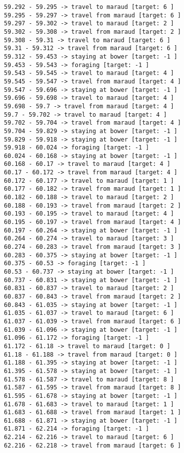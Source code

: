\documentclass[11pt]{article}
\begin{document}
\begin{Verbatim}[commandchars=\\\{\}]
59.292 - 59.295 -> travel to maraud [target: 6 ]
59.295 - 59.297 -> travel from maraud [target: 6 ]
59.297 - 59.302 -> travel to maraud [target: 2 ]
59.302 - 59.308 -> travel from maraud [target: 2 ]
59.308 - 59.31 -> travel to maraud [target: 6 ]
59.31 - 59.312 -> travel from maraud [target: 6 ]
59.312 - 59.453 -> staying at bower [target: -1 ]
59.453 - 59.543 -> foraging [target: -1 ]
59.543 - 59.545 -> travel to maraud [target: 4 ]
59.545 - 59.547 -> travel from maraud [target: 4 ]
59.547 - 59.696 -> staying at bower [target: -1 ]
59.696 - 59.698 -> travel to maraud [target: 4 ]
59.698 - 59.7 -> travel from maraud [target: 4 ]
59.7 - 59.702 -> travel to maraud [target: 4 ]
59.702 - 59.704 -> travel from maraud [target: 4 ]
59.704 - 59.829 -> staying at bower [target: -1 ]
59.829 - 59.918 -> staying at bower [target: -1 ]
59.918 - 60.024 -> foraging [target: -1 ]
60.024 - 60.168 -> staying at bower [target: -1 ]
60.168 - 60.17 -> travel to maraud [target: 4 ]
60.17 - 60.172 -> travel from maraud [target: 4 ]
60.172 - 60.177 -> travel to maraud [target: 1 ]
60.177 - 60.182 -> travel from maraud [target: 1 ]
60.182 - 60.188 -> travel to maraud [target: 2 ]
60.188 - 60.193 -> travel from maraud [target: 2 ]
60.193 - 60.195 -> travel to maraud [target: 4 ]
60.195 - 60.197 -> travel from maraud [target: 4 ]
60.197 - 60.264 -> staying at bower [target: -1 ]
60.264 - 60.274 -> travel to maraud [target: 3 ]
60.274 - 60.283 -> travel from maraud [target: 3 ]
60.283 - 60.375 -> staying at bower [target: -1 ]
60.375 - 60.53 -> foraging [target: -1 ]
60.53 - 60.737 -> staying at bower [target: -1 ]
60.737 - 60.831 -> staying at bower [target: -1 ]
60.831 - 60.837 -> travel to maraud [target: 2 ]
60.837 - 60.843 -> travel from maraud [target: 2 ]
60.843 - 61.035 -> staying at bower [target: -1 ]
61.035 - 61.037 -> travel to maraud [target: 6 ]
61.037 - 61.039 -> travel from maraud [target: 6 ]
61.039 - 61.096 -> staying at bower [target: -1 ]
61.096 - 61.172 -> foraging [target: -1 ]
61.172 - 61.18 -> travel to maraud [target: 0 ]
61.18 - 61.188 -> travel from maraud [target: 0 ]
61.188 - 61.395 -> staying at bower [target: -1 ]
61.395 - 61.578 -> staying at bower [target: -1 ]
61.578 - 61.587 -> travel to maraud [target: 8 ]
61.587 - 61.595 -> travel from maraud [target: 8 ]
61.595 - 61.678 -> staying at bower [target: -1 ]
61.678 - 61.683 -> travel to maraud [target: 1 ]
61.683 - 61.688 -> travel from maraud [target: 1 ]
61.688 - 61.871 -> staying at bower [target: -1 ]
61.871 - 62.214 -> foraging [target: -1 ]
62.214 - 62.216 -> travel to maraud [target: 6 ]
62.216 - 62.218 -> travel from maraud [target: 6 ]

\end{Verbatim}
\end{document}
